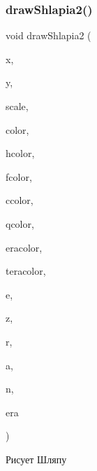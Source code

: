 \subsubsection{\texorpdfstring{draw\+Shlapia2()}{drawShlapia2()}}
{\footnotesize\ttfamily void draw\+Shlapia2 (\begin{DoxyParamCaption}\item[{int}]{x,  }\item[{int}]{y,  }\item[{double}]{scale,  }\item[{C\+O\+L\+O\+R\+R\+EF}]{color,  }\item[{C\+O\+L\+O\+R\+R\+EF}]{hcolor,  }\item[{C\+O\+L\+O\+R\+R\+EF}]{fcolor,  }\item[{C\+O\+L\+O\+R\+R\+EF}]{ccolor,  }\item[{C\+O\+L\+O\+R\+R\+EF}]{qcolor,  }\item[{C\+O\+L\+O\+R\+R\+EF}]{eracolor,  }\item[{C\+O\+L\+O\+R\+R\+EF}]{teracolor,  }\item[{int}]{e,  }\item[{int}]{z,  }\item[{int}]{r,  }\item[{int}]{a,  }\item[{int}]{n,  }\item[{int}]{era }\end{DoxyParamCaption})}



Рисует Шляпу 


